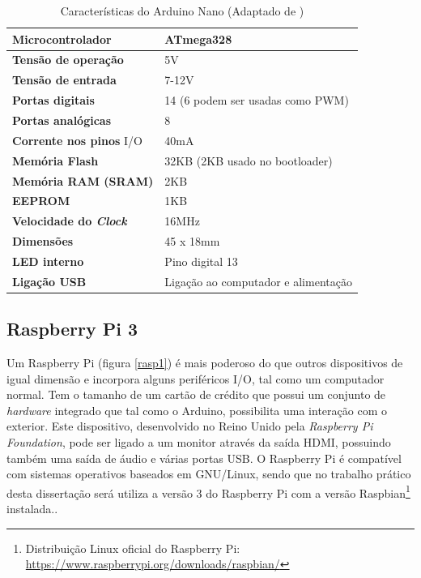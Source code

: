 \begin{table}[h]
	\centering
	
	\begin{tabular}{|
			>{\columncolor[HTML]{EFEFEF}}l |l|} \hline
		\textbf{Microcontrolador} & ATmega328 \\ \hline
		\textbf{Tensão de operação} & 5V \\ \hline
		\textbf{Tensão de entrada} & 7-12V \\ \hline
		\textbf{Portas digitais} & 14 (6 podem ser usadas como PWM) \\ \hline
		\textbf{Portas analógicas} & 8 \\ \hline
		\textbf{Corrente nos pinos} \ac{I/O} & 40mA \\ \hline
		\textbf{Memória Flash} & 32KB (2KB usado no bootloader) \\ \hline
		\textbf{Memória \acs{RAM} (SRAM)} & 2KB \\ \hline
		\textbf{EEPROM} & 1KB \\ \hline
		\textbf{Velocidade do \textit{Clock}} & 16MHz \\ \hline
		\textbf{Dimensões} & 45 x 18mm \\ \hline
		\textbf{\ac{LED} interno} & Pino digital 13 \\ \hline
		\textbf{Ligação \ac{USB}} & Ligação ao computador e alimentação \\ \hline
	\end{tabular}
	\caption[Características do Arduino Nano]{Características do Arduino Nano (Adaptado de \cite{Melorose2015})}
	\label{caraarduino}
\end{table}






\subsection{Raspberry Pi 3}

Um Raspberry Pi (figura \ref{rasp1}) é mais poderoso do que outros dispositivos de igual dimensão e incorpora alguns periféricos \ac{I/O}, tal como um computador normal. Tem o tamanho de um cartão de crédito que possui um conjunto de \textit{hardware} integrado que tal como o Arduino, possibilita uma interação com o exterior. Este dispositivo, desenvolvido no Reino Unido pela \textit{Raspberry Pi Foundation}, pode ser ligado a um monitor através da saída HDMI, possuindo também uma saída de áudio e várias portas \ac{USB}. O Raspberry Pi é compatível com sistemas operativos baseados em GNU/Linux, sendo que no trabalho prático desta dissertação será utiliza a versão 3 do Raspberry Pi com a versão Raspbian\footnote{Distribuição Linux oficial do Raspberry Pi:  \url{https://www.raspberrypi.org/downloads/raspbian/}} instalada\cite{RaspberryPiFoundation2012}..

